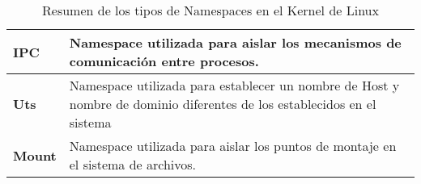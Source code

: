 \begin{table}[ht]
{\begin{tabular}{|l|l|}
\textbf{IPC}                                                                                             & Namespace utilizada para aislar los mecanismos de comunicación entre procesos.                                                                                                                                                               \\ \hline
\textbf{Uts}                                                                                             & Namespace utilizada para establecer un nombre de Host y nombre de dominio diferentes de los establecidos en el sistema                                                                                                                       \\ \hline
\textbf{Mount}                                                                                           & Namespace utilizada para aislar los puntos de montaje en el sistema de archivos.                                                                                                                                                             \\ \hline
\end{tabular}%
}
\caption{Resumen de los tipos de Namespaces en el Kernel de Linux}
\label{tab:linux_ns}
\end{table}